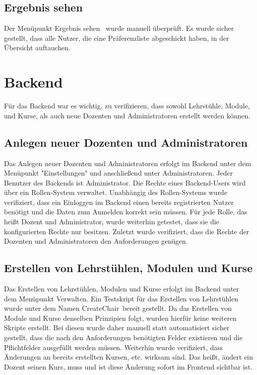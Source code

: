 		\subsection{Ergebnis sehen}
			Der Menüpunkt \glqq Ergebnis sehen\grqq~ wurde manuell überprüft.
			Es wurde sicher gestellt, dass alle Nutzer, die eine Präferenzliste abgeschickt haben, in der Übersicht auftauchen.\newline
		
	\section{Backend}
	
		Für das Backend war es wichtig. zu verifizieren, dass sowohl Lehrstühle, Module, und Kurse, als auch neue Dozenten und Administratoren erstellt werden können.
			
		\subsection{Anlegen neuer Dozenten und Administratoren}
		
			Das Anlegen neuer Dozenten und Administratoren erfolgt im Backend unter dem Menüpunkt "Einstellungen" und anschließend unter \glqq Administratoren\grqq .
			Jeder Benutzer des Backends ist Administrator.
			Die Rechte eines Backend-Users wird über ein Rollen-System verwaltet.\newline
			Unabhängig des Rollen-Systems wurde verifiziert, dass ein Einloggen im Backend einen bereits registrierten Nutzer benötigt und die Daten zum Anmelden korrekt sein müssen.\newline
			Für jede Rolle, das heißt Dozent und Administrator, wurde weiterhin getestet, dass sie die konfigurierten Rechte nur besitzen.\newline
			Zuletzt wurde verifiziert, dass die Rechte der Dozenten und Administratoren den Anforderungen genügen.
			
		\subsection{Erstellen von Lehrstühlen, Modulen und Kurse}
			
			Das Erstellen von Lehrstühlen, Modulen und Kurse erfolgt im Backend unter dem Menüpunkt \glqq Verwalten\grqq .\newline
			Ein Testskript für das Erstellen von Lehrstühlen wurde unter dem Namen \glqq CreateChair\grqq~bereit gestellt.
			Da das Erstellen von Module und Kurse denselben Prinzipien folgt, wurden hierfür keine weiteren Skripte erstellt.
			Bei diesen wurde daher manuell statt automatisiert sicher gestellt, dass die nach den Anforderungen benötigten Felder existieren und die Pflichtfelder ausgefüllt werden müssen.\newline
			Weiterhin wurde verifiziert, dass Änderungen an bereits erstellten Kursen, etc. wirksam sind.
			Das heißt, ändert ein Dozent seinen Kurs, muss und ist diese Änderung sofort im Frontend sichtbar ist.
	
